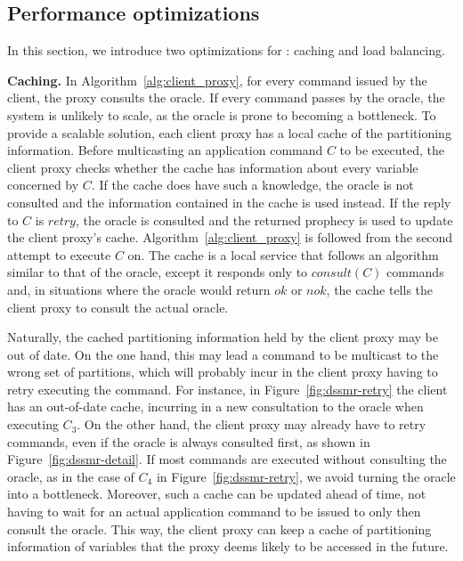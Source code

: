 \subsection{Performance optimizations}
\label{sec:dssmr-optm}

In this section, we introduce two optimizations for \dssmr{}: caching and load
balancing.

\textbf{Caching.} In Algorithm~\ref{alg:client_proxy}, for every command issued
by the client, the proxy consults the oracle. If every command passes by the
oracle, the system is unlikely to scale, as the oracle is prone to becoming a
bottleneck. To provide a scalable solution, each client proxy has a local cache
of the partitioning information. Before multicasting an application command $C$
to be executed, the client proxy checks whether the cache has information about
every variable concerned by $C$. If the cache does have such a knowledge, the
oracle is not consulted and the information contained in the cache is used
instead. If the reply to $C$ is $retry$, the oracle is consulted and the
returned prophecy is used to update the client proxy's cache.
Algorithm~\ref{alg:client_proxy} is followed from the second attempt to execute
$C$ on. The cache is a local service that follows an algorithm similar to that
of the oracle, except it responds only to $consult(C)$ commands and, in
situations where the oracle would return $ok$ or $nok$, the cache tells the
client proxy to consult the actual oracle.


Naturally, the cached partitioning information held by the client proxy may be
out of date. On the one hand, this may lead a command to be multicast to the
wrong set of partitions, which will probably incur in the client proxy having to
retry executing the command. For instance, in Figure~\ref{fig:dssmr-retry} the
client has an out-of-date cache, incurring in a new consultation to the oracle
when executing $C_3$. On the other hand, the client proxy may already have to
retry commands, even if the oracle is always consulted first, as shown in
Figure~\ref{fig:dssmr-detail}. If most commands are executed without consulting
the oracle, as in the case of $C_4$ in Figure~\ref{fig:dssmr-retry}, we avoid
turning the oracle into a bottleneck. Moreover, such a cache can be updated
ahead of time, not having to wait for an actual application command to be issued
to only then consult the oracle. This way, the client proxy can keep a cache of
partitioning information of variables that the proxy deems likely to be accessed
in the future.

